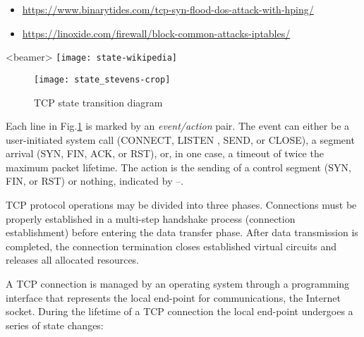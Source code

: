 \begin{itemize}
\item \url{https://www.binarytides.com/tcp-syn-flood-dos-attack-with-hping/}
\item \url{https://linoxide.com/firewall/block-common-attacks-iptables/}
\end{itemize}


\begin{frame}<beamer>
  \centering
  \texttt{[image: state-wikipedia]}
\end{frame}

\begin{figure}[!ht]
  \centering
  \texttt{[image: state\_stevens-crop]}
  \caption{TCP state transition diagram\label{fig:state}}
\end{figure}

Each line in Fig.\ref{fig:state} is marked by an \emph{event/action} pair. The event can
either be a user-initiated system call (CONNECT, LISTEN , SEND, or CLOSE), a segment
arrival (SYN, FIN, ACK, or RST), or, in one case, a timeout of twice the maximum packet
lifetime. The action is the sending of a control segment (SYN, FIN, or RST) or nothing,
indicated by --.

 TCP protocol operations may be divided
into three phases. Connections must be properly established in a multi-step handshake
process (connection establishment) before entering the data transfer phase. After data
transmission is completed, the connection termination closes established virtual circuits
and releases all allocated resources.

A TCP connection is managed by an operating system through a programming interface that
represents the local end-point for communications, the Internet socket. During the
lifetime of a TCP connection the local end-point undergoes a series of state
changes:

